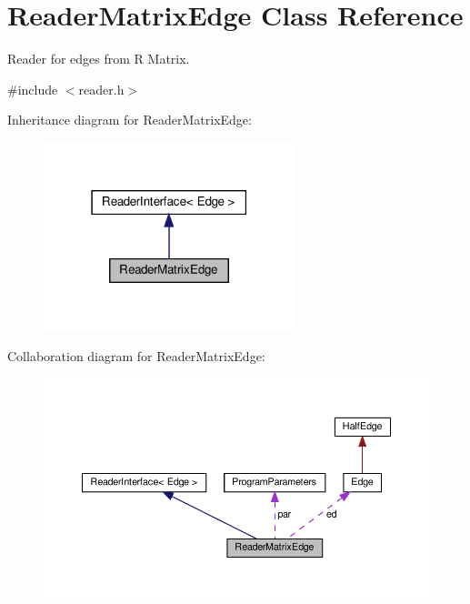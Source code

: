 \hypertarget{classReaderMatrixEdge}{}\section{Reader\+Matrix\+Edge Class Reference}
\label{classReaderMatrixEdge}


Reader for edges from R Matrix.  




{\ttfamily \#include $<$reader.\+h$>$}



Inheritance diagram for Reader\+Matrix\+Edge\+:
\nopagebreak
\begin{figure}[H]
\begin{center}
\leavevmode
\includegraphics[width=207pt]{classReaderMatrixEdge__inherit__graph}
\end{center}
\end{figure}


Collaboration diagram for Reader\+Matrix\+Edge\+:
\nopagebreak
\begin{figure}[H]
\begin{center}
\leavevmode
\includegraphics[width=350pt]{classReaderMatrixEdge__coll__graph}
\end{center}
\end{figure}
